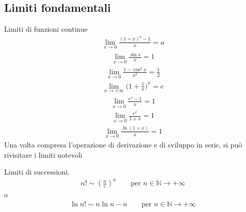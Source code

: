 \documentclass[letterpaper,10pt,english]{jupyterBook}
\begin{document}
\subsection{Limiti fondamentali}
\label{\detokenize{ch/infinitesimal_calculus/limits:limiti-fondamentali}}\label{\detokenize{ch/infinitesimal_calculus/limits:infinitesimal-calculus-limits-fund}}
\sphinxAtStartPar
Limiti di funzioni continue
\begin{equation*}
\begin{split} \lim_{x \rightarrow 0} \frac{(1+x)^a - 1}{x} = a \end{split}
\end{equation*}\begin{equation*}
\begin{split} \lim_{x \rightarrow 0} \frac{\sin x}{x} = 1 \end{split}
\end{equation*}\begin{equation*}
\begin{split} \lim_{x \rightarrow 0} \frac{1 - \cos^2 x}{x^2} = \frac{1}{2} \end{split}
\end{equation*}\begin{equation*}
\begin{split} \lim_{x \rightarrow +\infty} \Big( 1 + \frac{1}{x} \Big)^x = e \end{split}
\end{equation*}\begin{equation*}
\begin{split} \lim_{x \rightarrow 0} \frac{e^x - 1}{x}= 1 \end{split}
\end{equation*}\begin{equation*}
\begin{split} \lim_{x \rightarrow 0} \frac{e^x}{1+x}= 1 \end{split}
\end{equation*}\begin{equation*}
\begin{split} \lim_{x \rightarrow 0} \frac{\ln (1+x)}{x} = 1 \end{split}
\end{equation*}
\sphinxAtStartPar
Una volta compresa l’operazione di derivazione e di sviluppo in serie, si può rivisitare i limiti notevoli 

\sphinxAtStartPar
Limiti di successioni. 
\begin{equation*}
\begin{split}n! \sim \left(\frac{n}{e} \right)^n \qquad \text{per $n \in \mathbb{N} \rightarrow +\infty$}\end{split}
\end{equation*}
\sphinxAtStartPar
o
\begin{equation*}
\begin{split}\ln n! \sim n \ln n - n  \qquad \text{per $n \in \mathbb{N} \rightarrow +\infty$}\end{split}
\end{equation*}
\end{document}
